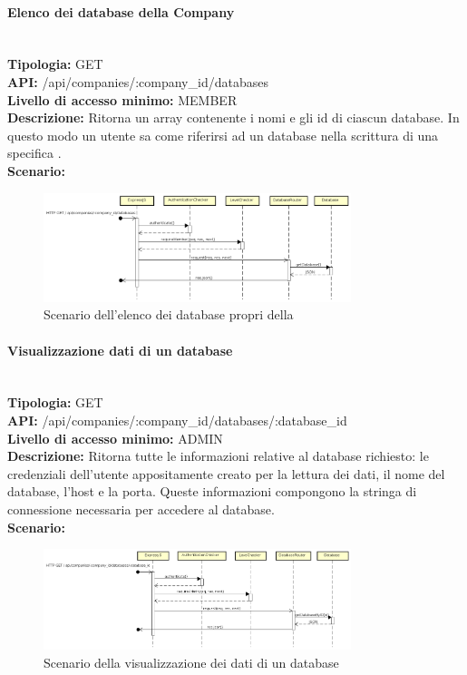 \paragraph{Elenco dei database della Company}\mbox{}\\
\textbf{Tipologia:} GET \\
\textbf{API:} /api/companies/:company\_id/databases \\
\textbf{Livello di accesso minimo:} MEMBER \\
\textbf{Descrizione:} Ritorna un array contenente i nomi e gli id di ciascun database. In questo modo un utente sa come riferirsi ad un database nella scrittura di una specifica . \\
\textbf{Scenario:}
\begin{figure}[H]
\centering
\includegraphics[width=0.8\textwidth]{res/sections/backend/sequence/(GET)database.png}
\caption{Scenario dell'elenco dei database propri della }
\end{figure}

\newpage
\paragraph{Visualizzazione dati di un database}\mbox{}\\
\textbf{Tipologia:} GET \\
\textbf{API:} /api/companies/:company\_id/databases/:database\_id \\
\textbf{Livello di accesso minimo:} ADMIN \\
\textbf{Descrizione:} Ritorna tutte le informazioni relative al database richiesto: le credenziali dell'utente appositamente creato per la lettura dei dati, il nome del database, l'host e la porta. Queste informazioni compongono la stringa di connessione necessaria per accedere al database. \\
\textbf{Scenario:} 
\begin{figure}[H]
\centering
\includegraphics[width=0.8\textwidth]{res/sections/backend/sequence/(GET)databaseById.png}
\caption{Scenario della visualizzazione dei dati di un database}
\end{figure}

